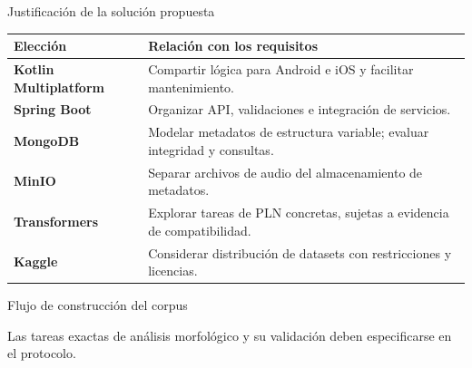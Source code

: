 \documentclass[aspectratio=169,10pt]{beamer}
\begin{document}
\begin{frame}{Justificación de la solución propuesta}
\begin{tabularx}{\linewidth}{>{\bfseries}p{3.0cm}X}\toprule Elección & Relación con los requisitos\\\midrule
Kotlin Multiplatform & Compartir lógica para Android e iOS y facilitar mantenimiento.\\
Spring Boot & Organizar API, validaciones e integración de servicios.\\
MongoDB & Modelar metadatos de estructura variable; evaluar integridad y consultas.\\
MinIO & Separar archivos de audio del almacenamiento de metadatos.\\
Transformers & Explorar tareas de PLN concretas, sujetas a evidencia de compatibilidad.\\
Kaggle & Considerar distribución de datasets con restricciones y licencias.\\\bottomrule\end{tabularx}
\end{frame}
\begin{frame}{Flujo de construcción del corpus}
\centering{}
\vspace{.55cm}\small\color{NahuaGray}Las tareas exactas de análisis morfológico y su validación deben especificarse en el protocolo.
\end{frame}
\end{document}
